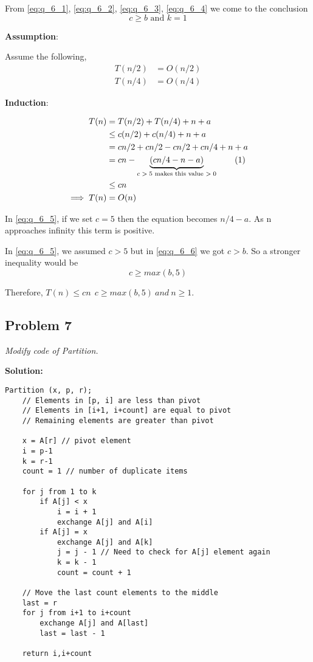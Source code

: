 \documentclass[12pt,a4paper]{article}
\newcommand\numberthis{\addtocounter{equation}{1}\tag{\theequation}}
\newcommand{\solution}{\noindent\textbf{Solution:}\\}
\begin{document}
From \eqref{eq:q_6_1}, \eqref{eq:q_6_2}, \eqref{eq:q_6_3}, \eqref{eq:q_6_4} we come to the conclusion
\begin{equation}
    c \geq b \text{ and } k = 1\label{eq:q_6_6}
\end{equation}

\textbf{Assumption}:

Assume the following,
\begin{align}
    T(n/2) &= O(n/2) \\
    T(n/4) &= O(n/4)
\end{align}

\textbf{Induction}:

\begin{align*}
    T(n) &= T(n/2) + T(n/4) + n + a \\
         &\leq c(n/2) + c(n/4) + n + a \\
         &= cn/2 + cn/2 - cn/2 + cn/4 + n + a \\
         &= cn - \underbrace{(cn/4 - n - a)}_{\text{$c>5$ makes this value $>0$}} \numberthis \label{eq:q_6_5}\\
         &\leq cn \\
         \implies T(n) &= O(n)
\end{align*}

In \eqref{eq:q_6_5}, if we set $c=5$ then the equation becomes $n/4 - a$. As n approaches infinity this term is positive.

In \eqref{eq:q_6_5}, we assumed $c > 5$ but in \eqref{eq:q_6_6} we got $c > b$. So a stronger inequality would be
\begin{equation}
    c \geq max(b, 5)
\end{equation}

Therefore, $T(n) \leq cn\ \ c \geq max(b,5)\ and\ n \geq 1$.

\newpage
\subsection*{Problem 7}
\textit{
    Modify code of Partition.
}

\solution
\begin{lstlisting}[title=Modified binary search, mathescape=true]
Partition (x, p, r);
    // Elements in [p, i] are less than pivot
    // Elements in [i+1, i+count] are equal to pivot
    // Remaining elements are greater than pivot
    
    x = A[r] // pivot element
    i = p-1 
    k = r-1
    count = 1 // number of duplicate items
    
    for j from 1 to k
        if A[j] < x
            i = i + 1
            exchange A[j] and A[i]
        if A[j] = x
            exchange A[j] and A[k]
            j = j - 1 // Need to check for A[j] element again
            k = k - 1
            count = count + 1
    
    // Move the last count elements to the middle       
    last = r
    for j from i+1 to i+count
        exchange A[j] and A[last]
        last = last - 1
    
    return i,i+count
\end{lstlisting}
\end{document}
